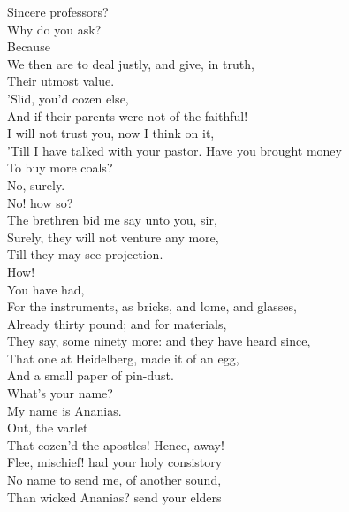 \documentclass{memoir}
\begin{document}
\begin{drama*}
 Sincere professors?\\
\subtlespeaks {} Why do you ask?\\
\ananiasspeaks {} Because\\
 We then are to deal justly, and give, in truth,\\
 Their utmost value.\\
\subtlespeaks {} 'Slid, you'd cozen else,\\
 And if their parents were not of the faithful!--\\
 I will not trust you, now I think on it,\\
 'Till I have talked with your pastor. Have you brought money\\
 To buy more coals?\\
\ananiasspeaks {} No, surely.\\
\subtlespeaks {} No! how so?\\
\ananiasspeaks  The brethren bid me say unto you, sir,\\
 Surely, they will not venture any more,\\
 Till they may see projection.\\
\subtlespeaks {} How!\\
\ananiasspeaks {} You have had,\\
 For the instruments, as bricks, and lome, and glasses,\\
 Already thirty pound; and for materials,\\
 They say, some ninety more: and they have heard since,\\
 That one at Heidelberg, made it of an egg,\\
 And a small paper of pin-dust.\\
\subtlespeaks {} What's your name?\\
\ananiasspeaks  My name is Ananias.\\
\subtlespeaks {} Out, the varlet\\
 That cozen'd the apostles! Hence, away!\\
 Flee, mischief! had your holy consistory\\
 No name to send me, of another sound,\\
 Than wicked Ananias? send your elders\\

\end{drama*}
\end{document}
